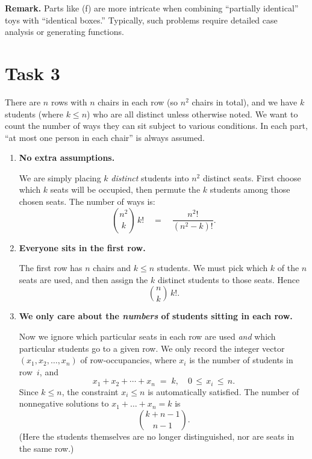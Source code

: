 \documentclass[docmute]{article}
\begin{document}
\bigskip
\noindent
\textbf{Remark.} Parts like (f) are more intricate when combining “partially identical” toys with “identical boxes.” Typically, such problems require detailed case analysis or generating functions.

\section{Task 3}

There are \(n\) rows with \(n\) chairs in each row (so \(n^2\) chairs in total), and we have \(k\) students (where \(k \le n\)) who are all distinct unless otherwise noted. We want to count the number of ways they can sit subject to various conditions. In each part, “at most one person in each chair” is always assumed.

\begin{enumerate}
  \item[\textbf{(a)}]
    \textbf{No extra assumptions.}

    We are simply placing \(k\) \emph{distinct} students into \(n^2\) distinct seats. First choose which \(k\) seats will be occupied, then permute the \(k\) students among those chosen seats. The number of ways is:
    \[
      \binom{n^2}{k}\,k!
      \quad=\quad \frac{n^2!}{(n^2 - k)!}.
    \]

  \item[\textbf{(b)}]
    \textbf{Everyone sits in the first row.}

    The first row has \(n\) chairs and \(k \le n\) students. We must pick which \(k\) of the \(n\) seats are used, and then assign the \(k\) distinct students to those seats. Hence
    \[
      \binom{n}{k}\,k!.
    \]

  \item[\textbf{(c)}]
    \textbf{We only care about the \emph{numbers} of students sitting in each row.}

    Now we ignore which particular seats in each row are used \emph{and} which particular students go to a given row.  We only record the integer vector \((x_1, x_2,\dots, x_n)\) of row‐occupancies, where \(x_i\) is the number of students in row~\(i\), and
    \[
      x_1 + x_2 + \cdots + x_n \;=\; k,
      \quad 0 \,\le\, x_i \,\le\, n.
    \]
    Since \(k \le n\), the constraint \(x_i \le n\) is automatically satisfied.  The number of nonnegative solutions to \(x_1 + \dots + x_n = k\) is
    \[
      \binom{k + n - 1}{n - 1}.
    \]
    (Here the students themselves are no longer distinguished, nor are seats in the same row.)


\end{enumerate}
\end{document}
